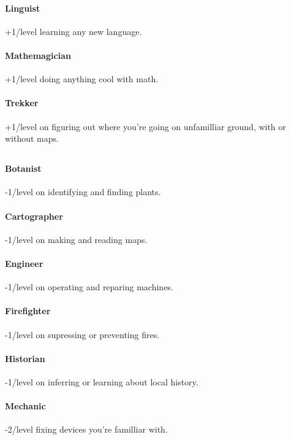 \paragraph{Linguist}
+1/level learning any new language.

\paragraph{Mathemagician}
+1/level doing anything cool with math.

\paragraph{Trekker}
+1/level on figuring out where you're going on unfamilliar ground, with or without maps.

\subsection{\lasersC}

\paragraph{Botanist}
-1/level on identifying and finding plants.

\paragraph{Cartographer}
-1/level on making and reading maps.

\paragraph{Engineer}
-1/level on operating and reparing machines.

\paragraph{Firefighter}
-1/level on supressing or preventing fires.

\paragraph{Historian}
-1/level on inferring or learning about local history.

\paragraph{Mechanic}
-2/level fixing devices you're familliar with.

